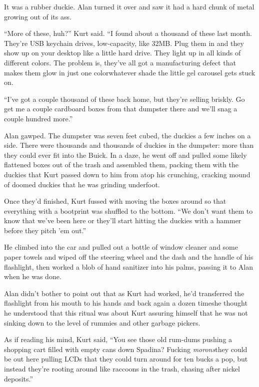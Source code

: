 It was a rubber duckie.  Alan turned it over and saw it had a hard
chunk of metal growing out of its ass.

``More of these, huh?'' Kurt said.  ``I found about a thousand of
these last month.  They're USB keychain drives, low-capacity, like
32MB.  Plug them in and they show up on your desktop like a little
hard drive.  They light up in all kinds of different colors.  The
problem is, they've all got a manufacturing defect that makes them
glow in just one color\dash{}whatever shade the little gel carousel gets
stuck on.

``I've got a couple thousand of these back home, but they're selling
briskly.  Go get me a couple cardboard boxes from that dumpster there
and we'll snag a couple hundred more.''

Alan gawped.  The dumpster was seven feet cubed, the duckies a few
inches on a side.  There were thousands and thousands of duckies in
the dumpster:  more than they could ever fit into the Buick.  In a
daze, he went off and pulled some likely flattened boxes out of the
trash and assembled them, packing them with the duckies that Kurt
passed down to him from atop his crunching, cracking mound of doomed
duckies that he was grinding underfoot.

Once they'd finished, Kurt fussed with moving the boxes around so that
everything with a bootprint was shuffled to the bottom.  ``We don't
want them to know that we've been here or they'll start hitting the
duckies with a hammer before they pitch 'em out.''

He climbed into the car and pulled out a bottle of window cleaner and
some paper towels and wiped off the steering wheel and the dash and
the handle of his flashlight, then worked a blob of hand sanitizer
into his palms, passing it to Alan when he was done.

Alan didn't bother to point out that as Kurt had worked, he'd
transferred the flashlight from his mouth to his hands and back again
a dozen times\dash{}he thought he understood that this ritual was about
Kurt assuring himself that he was not sinking down to the level of
rummies and other garbage pickers.

As if reading his mind, Kurt said, ``You see those old rum-dums
pushing a shopping cart filled with empty cans down Spadina?  Fucking
\textit{morons}\dash{}they could be out here pulling LCDs that they could
turn around for ten bucks a pop, but instead they're rooting around
like raccoons in the trash, chasing after nickel deposits.''


